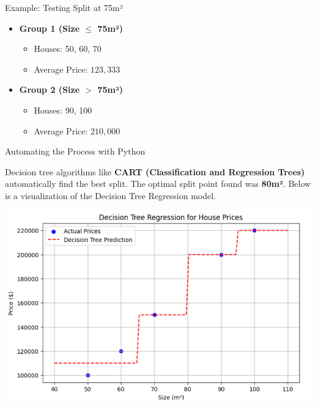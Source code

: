 \documentclass[11pt]{beamer}
\begin{document}
%
%
\begin{frame}{Example: Testing Split at 75m²}
    \begin{itemize}
        \item \textbf{Group 1 (Size $\leq$ 75m²)}
        \begin{itemize}
            \item Houses: 50, 60, 70
            \item Average Price: $123,333$
        \end{itemize}
        \item \textbf{Group 2 (Size $>$ 75m²)}
        \begin{itemize}
            \item Houses: 90, 100
            \item Average Price: $210,000$
        \end{itemize}
    \end{itemize}
\end{frame}
%
%
\begin{frame}{Automating the Process with Python}

Decision tree algorithms like \textbf{CART (Classification and Regression Trees)} automatically find the best split. The optimal split point found was \textbf{80m²}. Below is a visualization of the Decision Tree Regression model.

    \begin{center}
        \includegraphics[width=0.8\linewidth]{../05-pictures/lesson-3-3_pic_9.png}
    \end{center}
\end{frame}
%
\end{document}
